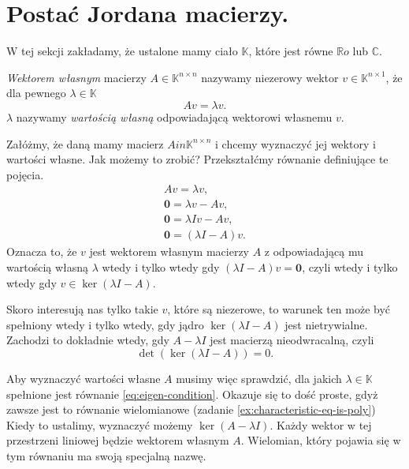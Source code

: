 \section{Postać Jordana macierzy.}

W tej sekcji zakładamy,
	że ustalone mamy ciało $\mathbb{K}$,
	które jest równe $\mathbb{R}o$ lub $\mathbb{C}$.

\begin{definition}
	\textit{Wektorem własnym} macierzy $A \in \mathbb{K}^{n \times n}$
		nazywamy niezerowy wektor $v \in \mathbb{K}^{n \times 1}$,
		że dla pewnego $\lambda \in \mathbb{K}$
	\begin{equation}
		Av = \lambda v.
	\end{equation}
	$\lambda$ nazywamy \textit{wartością własną} odpowiadającą wektorowi własnemu $v$.
\end{definition}

Załóżmy,
	że daną mamy macierz $A in \mathbb{K}^{n \times n}$
	i chcemy wyznaczyć jej wektory i wartości własne.
Jak możemy to zrobić?
Przekształćmy równanie definiujące te pojęcia.
\begin{align}
	Av = \lambda v, \\
	\textbf{0} = \lambda v - Av, \\
	\textbf{0} = \lambda I v - Av, \\
	\textbf{0} = (\lambda I - A) v.
\end{align}
Oznacza to,
	że $v$ jest wektorem własnym macierzy $A$ z odpowiadającą mu wartością własną $\lambda$
	wtedy i tylko wtedy gdy $(\lambda I - A) v = \textbf{0}$,
	czyli wtedy i tylko wtedy gdy $v \in \ker(\lambda I - A)$.

Skoro interesują nas tylko takie $v$,
	które są niezerowe,
	to warunek ten może być spełniony wtedy i tylko wtedy,
	gdy jądro $\ker(\lambda I - A)$ jest nietrywialne.
Zachodzi to dokładnie wtedy,
	gdy $A - \lambda I$ jest macierzą nieodwracalną,
	czyli
\begin{equation}\label{eq:eigen-condition}
	\det(\ker(\lambda I - A)) = 0.
\end{equation}

Aby wyznaczyć wartości własne $A$ musimy więc sprawdzić,
	dla jakich $\lambda \in \mathbb{K}$ spełnione jest równanie \ref{eq:eigen-condition}.
Okazuje się to dość proste, gdyż zawsze jest to równanie wielomianowe (zadanie \ref{ex:characteristic-eq-is-poly})
Kiedy to ustalimy,
	wyznaczyć możemy $\ker(A - \lambda I)$.
Każdy wektor w tej przestrzeni liniowej będzie wektorem własnym $A$.
Wielomian,
	który pojawia się w tym równaniu ma swoją specjalną nazwę.

